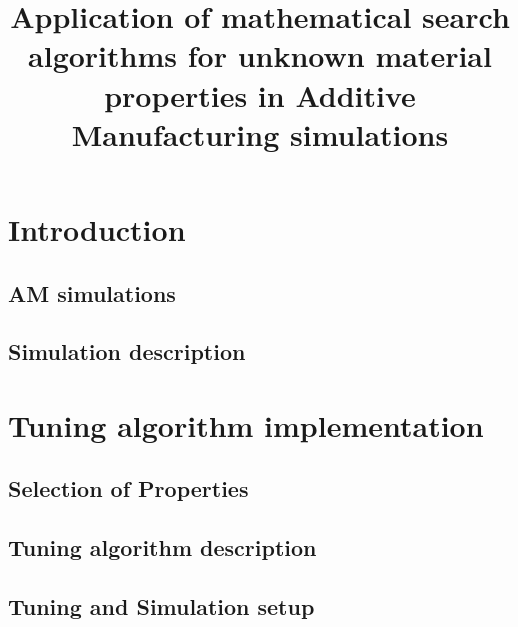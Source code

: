 \documentclass[pdflatex,sn-basic]{sn-jnl}
\begin{document}
\title[Searching for unknown material properties for AM simulations]{Application of mathematical search algorithms for unknown material properties in Additive Manufacturing simulations}


\author[1]{ }
\author[1]{ }


\abstract{
	
	}



\maketitle

\section{Introduction}
	\subsection{\Acf{AM} simulations}
	


	\subsection{Simulation description}
	

\section{Tuning algorithm implementation}
	\subsection{Selection of Properties}
	

	\subsection{Tuning algorithm description}
	

	\subsection{Tuning and Simulation setup}
	
\end{document}
